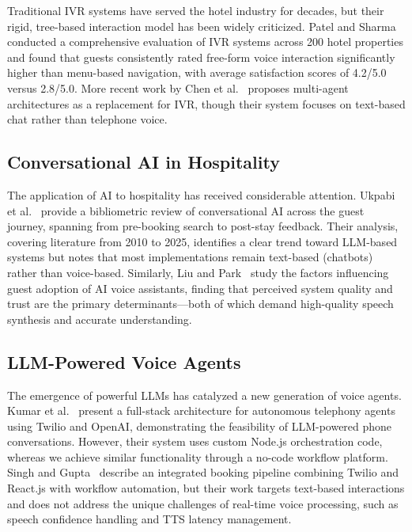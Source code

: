 \documentclass[conference]{IEEEtran}
\begin{document}
Traditional IVR systems have served the hotel industry for decades, but their rigid, tree-based interaction model has been widely criticized. Patel and Sharma~\cite{patel2023ivr} conducted a comprehensive evaluation of IVR systems across 200 hotel properties and found that guests consistently rated free-form voice interaction significantly higher than menu-based navigation, with average satisfaction scores of 4.2/5.0 versus 2.8/5.0. More recent work by Chen et al.~\cite{chen2025multiagent} proposes multi-agent architectures as a replacement for IVR, though their system focuses on text-based chat rather than telephone voice.

\subsection{Conversational AI in Hospitality}

The application of AI to hospitality has received considerable attention. Ukpabi et al.~\cite{ukpabi2024chatbot} provide a bibliometric review of conversational AI across the guest journey, spanning from pre-booking search to post-stay feedback. Their analysis, covering literature from 2010 to 2025, identifies a clear trend toward LLM-based systems but notes that most implementations remain text-based (chatbots) rather than voice-based. Similarly, Liu and Park~\cite{liu2023adoption} study the factors influencing guest adoption of AI voice assistants, finding that perceived system quality and trust are the primary determinants---both of which demand high-quality speech synthesis and accurate understanding.

\subsection{LLM-Powered Voice Agents}

The emergence of powerful LLMs has catalyzed a new generation of voice agents. Kumar et al.~\cite{kumar2026voiceagent} present a full-stack architecture for autonomous telephony agents using Twilio and OpenAI, demonstrating the feasibility of LLM-powered phone conversations. However, their system uses custom Node.js orchestration code, whereas we achieve similar functionality through a no-code workflow platform. Singh and Gupta~\cite{singh2025integrated} describe an integrated booking pipeline combining Twilio and React.js with workflow automation, but their work targets text-based interactions and does not address the unique challenges of real-time voice processing, such as speech confidence handling and TTS latency management.
\end{document}
